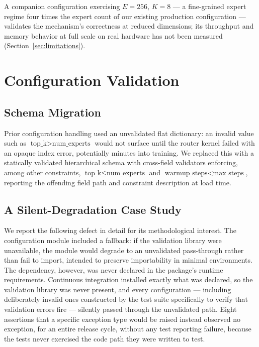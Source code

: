 \documentclass[conference]{IEEEtran}
\begin{document}
A companion configuration exercising $E{=}256$, $K{=}8$ --- a fine-grained
expert regime four times the expert count of our existing production
configuration --- validates the mechanism's correctness at reduced
dimensions; its throughput and memory behavior at full scale on real
hardware has not been measured (Section~\ref{sec:limitations}).

\section{Configuration Validation}
\label{sec:config}

\subsection{Schema Migration}

Prior configuration handling used an unvalidated flat dictionary: an
invalid value such as $\text{top\_k} > \text{num\_experts}$ would not
surface until the router kernel failed with an opaque index error,
potentially minutes into training. We replaced this with a statically
validated hierarchical schema with cross-field validators enforcing, among
other constraints, $\text{top\_k} \le \text{num\_experts}$ and
$\text{warmup\_steps} < \text{max\_steps}$, reporting the offending field
path and constraint description at load time.

\subsection{A Silent-Degradation Case Study}

We report the following defect in detail for its methodological interest.
The configuration module included a fallback: if the validation library
were unavailable, the module would degrade to an unvalidated pass-through
rather than fail to import, intended to preserve importability in minimal
environments. The dependency, however, was never declared in the package's
runtime requirements. Continuous integration installed exactly what was
declared, so the validation library was never present, and every
configuration --- including deliberately invalid ones constructed by the
test suite specifically to verify that validation errors fire --- silently
passed through the unvalidated path. Eight assertions that a specific
exception type would be raised instead observed no exception, for an
entire release cycle, without any test reporting failure, because the
tests never exercised the code path they were written to test.
\end{document}
